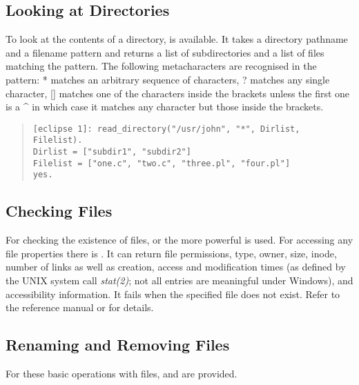 \subsection{Looking at Directories}
To look at the contents of a directory,  is available.
It takes a directory pathname and a filename pattern and returns a list
of subdirectories and a list of files matching the pattern.
The following metacharacters are recognised in the pattern:
* matches an arbitrary sequence of characters,
? matches any single character, [] matches one of the
characters inside the brackets unless the first one is a \^\space\space
in which case it matches any character but those inside the brackets.
\begin{quote}\begin{verbatim}
[eclipse 1]: read_directory("/usr/john", "*", Dirlist, Filelist).
Dirlist = ["subdir1", "subdir2"]
Filelist = ["one.c", "two.c", "three.pl", "four.pl"]
yes.
\end{verbatim}\end{quote}

\subsection{Checking Files}
For checking the existence of files,
 or the more powerful
 is used.
For accessing any file properties there is .
It can return file permissions, type, owner, size, inode, number of
links as well as creation, access and modification times
(as defined by the UNIX system call {\it stat(2)}; not all entries are
meaningful under Windows), and accessibility
information.
It fails when the specified file does not exist.
Refer to the reference manual or  for details.

\subsection{Renaming and Removing Files}
For these basic operations with files,  and 
are provided.

